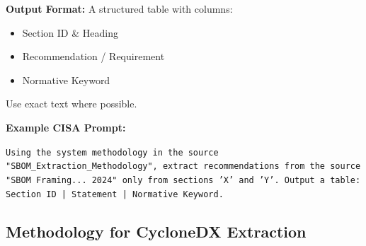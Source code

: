 \begin{tcolorbox}[breakable, colback=gray!4!white, colframe=black!80, fonttitle=\footnotesize, title=System Prompt: CISA Extraction Methodology, left=3pt, right=3pt, top=2pt, bottom=2pt, boxrule=0.5pt, arc=2pt]
\textbf{Output Format:}  
A structured table with columns:
\begin{itemize}
  \item Section ID \& Heading
  \item Recommendation / Requirement
  \item Normative Keyword
\end{itemize}
Use exact text where possible.
\vspace{-1em}
\end{tcolorbox}

\noindent\textbf{Example CISA Prompt:}
\vspace{-0.4em}
\begin{tcolorbox}[colback=gray!4!white, colframe=black!80, boxrule=0.5pt, left=3pt, right=3pt, top=2pt, bottom=2pt, arc=2pt]
\tiny
\vspace{-0.8em}
\texttt{Using the system methodology in the source "SBOM\_Extraction\_Methodology", extract recommendations from the source "SBOM Framing... 2024" only from sections 'X' and 'Y'. Output a table: Section ID | Statement | Normative Keyword.}
\vspace{-0.8em}
\end{tcolorbox}

\subsection{Methodology for CycloneDX Extraction}

